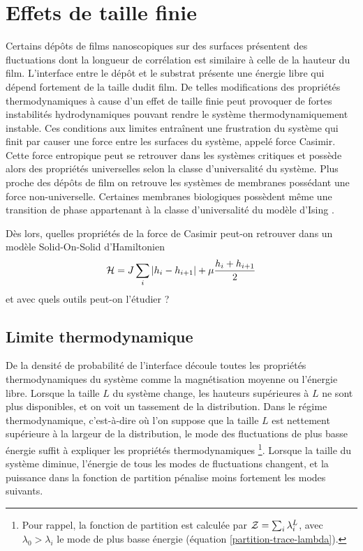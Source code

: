 \chapter{Effets de taille finie}
    \label{chap-sos}



Certains dépôts de films nanoscopiques sur des surfaces présentent des fluctuations dont la longueur de corrélation est similaire à celle de la hauteur du film. L'interface entre le dépôt et le substrat présente une énergie libre qui dépend fortement de la taille dudit film\cite{ouyang_size-dependent_2006,jiang_size_2008}. De telles modifications des propriétés thermodynamiques à cause d'un effet de taille finie peut provoquer de fortes instabilités hydrodynamiques pouvant rendre le système thermodynamiquement instable\cite{ding_theoretical_2001}. Ces conditions aux limites entraînent une frustration du système qui finit par causer une force entre les surfaces du système, appelé force Casimir. Cette force entropique peut se retrouver dans les systèmes critiques et possède alors des propriétés universelles selon la classe d'universalité du système. Plus proche des dépôts de film on retrouve les systèmes de membranes\cite{nelson_statistical_2004} possédant une force non-universelle\cite{hasnaoui_casimir_2010}. Certaines membranes biologiques possèdent même une transition de phase appartenant à la classe d'universalité du modèle d'Ising \cite{machta_critical_2012}.

Dès lors, quelles propriétés de la force de Casimir peut-on retrouver dans un modèle Solid-On-Solid d'Hamiltonien
\begin{align}
    \mathcal{H} = J \sum_i |h_i-h_{i+1}| + \mu \frac{h_i+h_{i+1}}{2}
\end{align}
et avec quels outils peut-on l'étudier ?

\section{Limite thermodynamique}

De la densité de probabilité de l'interface découle toutes les propriétés thermodynamiques du système comme la magnétisation moyenne ou l'énergie libre. Lorsque la taille $L$ du système change, les hauteurs supérieures à $L$ ne sont plus disponibles, et on voit un tassement de la distribution. Dans le régime thermodynamique, c'est-à-dire où l'on suppose que la taille $L$ est nettement supérieure à la largeur de la distribution, le mode des fluctuations de plus basse énergie suffit à expliquer les propriétés thermodynamiques \footnote{Pour rappel, la fonction de partition est calculée par $\mathcal{Z} = \sum_i \lambda_i^L$, avec $\lambda_0 \greater \lambda_i$ le mode de plus basse énergie (équation \ref{partition-trace-lambda}).}. Lorsque la taille du système diminue, l'énergie de tous les modes de fluctuations changent, et la puissance dans la fonction de partition pénalise moins fortement les modes suivants. 

